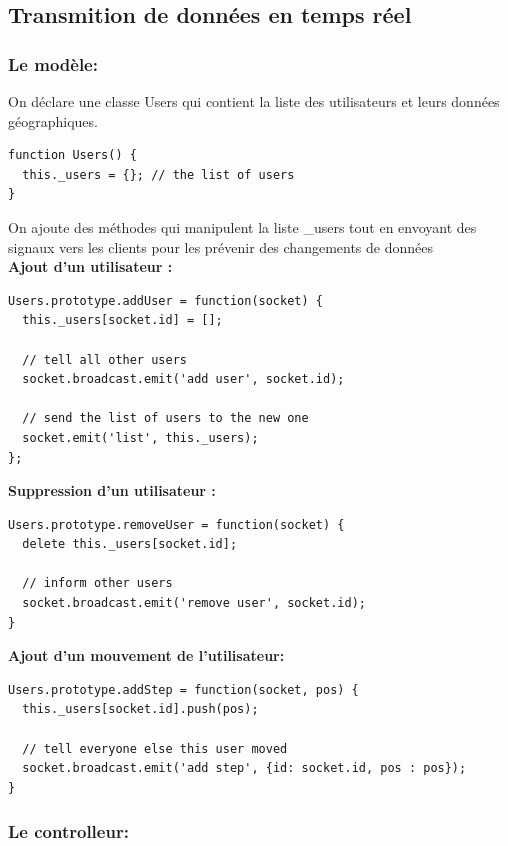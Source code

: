 \documentclass[a4paper]{article}
\begin{document}
\subsection{Transmition de données en temps réel}


\subsubsection{Le modèle:}

On déclare une classe Users qui contient la liste des utilisateurs
et leurs données géographiques.

\begin{lstlisting}
function Users() {
  this._users = {}; // the list of users
}
\end{lstlisting}

On ajoute des méthodes qui manipulent la liste \_users tout en envoyant des signaux
vers les clients pour les prévenir des changements de données\\

\textbf{Ajout d'un utilisateur : }

\begin{lstlisting}
Users.prototype.addUser = function(socket) {
  this._users[socket.id] = [];

  // tell all other users
  socket.broadcast.emit('add user', socket.id);

  // send the list of users to the new one
  socket.emit('list', this._users);
};
\end{lstlisting}

\textbf{Suppression d'un utilisateur : }
\begin{lstlisting}
Users.prototype.removeUser = function(socket) {
  delete this._users[socket.id];

  // inform other users
  socket.broadcast.emit('remove user', socket.id);
}
\end{lstlisting}

\textbf{Ajout d'un mouvement de l'utilisateur:}
\begin{lstlisting}
Users.prototype.addStep = function(socket, pos) {
  this._users[socket.id].push(pos);

  // tell everyone else this user moved 
  socket.broadcast.emit('add step', {id: socket.id, pos : pos});
}
\end{lstlisting}

\subsubsection{Le controlleur:}
\end{document}

